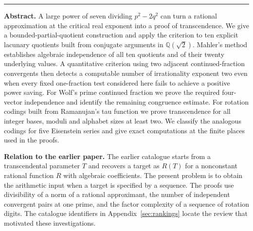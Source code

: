 \documentclass[11pt,a4paper]{article}
\newcommand{\Q}{\mathbb Q}\newcommand{\Z}{\mathbb Z}\newcommand{\PP}{\mathbb P}\newcommand{\SL}{\mathrm{SL}}
\begin{document}
\thispagestyle{empty}
\par
\vspace{1.25em}
\vspace{.6em}
\vspace{.7em}
\noindent\rule{\linewidth}{.45pt}
\smallskip

\noindent\textbf{Abstract.}
A large power of seven dividing $p^2-2q^2$ can turn a rational approximation
at the critical real exponent into a proof of transcendence. We give a
bounded-partial-quotient construction and apply the criterion to ten explicit
lacunary quotients built from conjugate arguments in $\Q(\sqrt2)$. Mahler's method establishes algebraic
independence of all ten quotients and of their twenty underlying values.
A quantitative criterion using two adjacent continued-fraction convergents
then detects a computable number of irrationality exponent two even when
every fixed one-fraction test considered here fails to achieve a positive
power saving. For Wolf's prime continued fraction we prove the required
four-vector independence and identify the remaining congruence estimate.
For rotation codings built from Ramanujan's tau function we prove
transcendence for all integer bases, moduli and alphabet sizes at least
two. We classify the analogous codings for five Eisenstein series and
give exact computations at the finite places used in the proofs.
\smallskip

\noindent\textbf{Relation to the earlier paper.}
The earlier catalogue \cite{catalogue} starts from a transcendental parameter
$T$ and recovers a target as $R(T)$ for a nonconstant rational function $R$
with algebraic coefficients. The present problem is to obtain the arithmetic
input when a target is specified by a sequence. The proofs use divisibility of a norm of a rational approximant,
the number of independent convergent pairs at one prime, and the factor
complexity of a sequence of rotation digits. The catalogue identifiers in
Appendix~\ref{sec:rankings} locate the review that motivated these investigations.

\begingroup\small
\tableofcontents
\endgroup
\clearpage
\end{document}
